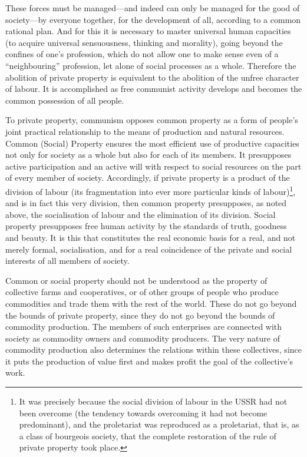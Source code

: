 \documentclass[../main]{subfiles}
\begin{document}
These forces must be managed—and indeed can only be managed for the good of society—by everyone together, for the development of all, according to a common rational plan. And for this it is necessary to master universal human capacities (to acquire universal sensuousness, thinking and morality), going beyond the confines of one's profession, which do not allow one to make sense even of a “neighbouring” profession, let alone of social processes as a whole. Therefore the abolition of private property is equivalent to the abolition of the unfree character of labour. It is accomplished as free communist activity develops and becomes the common possession of all people.

To private property, communism opposes common property as a form of people's joint practical relationship to the means of production and natural resources. Common (Social) Property ensures the most efficient use of productive capacities not only for society as a whole but also for each of its members. It presupposes active participation and an active will with respect to social resources on the part of every member of society. Accordingly, if private property is a product of the division of labour (its fragmentation into ever more particular kinds of labour)\footnote{It was precisely because the social division of labour in the USSR had not been overcome (the tendency towards overcoming it had not become predominant), and the proletariat was reproduced as a proletariat, that is, as a class of bourgeois society, that the complete restoration of the rule of private property took place.}, and is in fact this very division, then common property presupposes, as noted above, the socialisation of labour and the elimination of its division. Social property presupposes free human activity by the standards of truth, goodness and beauty. It is this that constitutes the real economic basis for a real, and not merely formal, socialisation, and for a real coincidence of the private and social interests of all members of society.

Common or social property should not be understood as the property of collective farms and cooperatives, or of other groups of people who produce commodities and trade them with the rest of the world. These do not go beyond the bounds of private property, since they do not go beyond the bounds of commodity production. The members of such enterprises are connected with society as commodity owners and commodity producers. The very nature of commodity production also determines the relations within these collectives, since it puts the production of value first and makes profit the goal of the collective's work.
\end{document}
